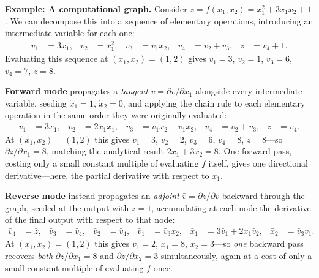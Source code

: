 \begin{exampleBox}
  \textbf{Example: A computational graph.} Consider $z=f(x_1,x_2)=x_1^2+3x_1x_2+1$. We can decompose this into a sequence of elementary operations, introducing an intermediate variable for each one:
  \begin{align*}
    v_1 &= 3x_1, & v_2 &= x_1^2, & v_3 &= v_1 x_2, & v_4 &= v_2+v_3, & z &= v_4+1.
  \end{align*}
  Evaluating this sequence at $(x_1,x_2)=(1,2)$ gives $v_1=3$, $v_2=1$, $v_3=6$, $v_4=7$, $z=8$.

  \textbf{Forward mode} propagates a \emph{tangent} $\dot v = \partial v/\partial x_1$ alongside every intermediate variable, seeding $\dot x_1=1$, $\dot x_2=0$, and applying the chain rule to each elementary operation in the same order they were originally evaluated:
  \begin{align*}
    \dot v_1 &= 3\dot x_1, & \dot v_2 &= 2x_1\dot x_1, & \dot v_3 &= \dot v_1 x_2+v_1\dot x_2, & \dot v_4 &= \dot v_2+\dot v_3, & \dot z &= \dot v_4.
  \end{align*}
  At $(x_1,x_2)=(1,2)$ this gives $\dot v_1=3$, $\dot v_2=2$, $\dot v_3=6$, $\dot v_4=8$, $\dot z=8$---so $\partial z/\partial x_1=8$, matching the analytical result $2x_1+3x_2=8$. One forward pass, costing only a small constant multiple of evaluating $f$ itself, gives one directional derivative---here, the partial derivative with respect to $x_1$.

  \textbf{Reverse mode} instead propagates an \emph{adjoint} $\bar v=\partial z/\partial v$ backward through the graph, seeded at the output with $\bar z=1$, accumulating at each node the derivative of the final output with respect to that node:
  \begin{align*}
    \bar v_4 &= \bar z, & \bar v_3&=\bar v_4, & \bar v_2&=\bar v_4, & \bar v_1&=\bar v_3 x_2, & \bar x_1&=3\bar v_1+2x_1\bar v_2, & \bar x_2&=\bar v_3 v_1.
  \end{align*}
  At $(x_1,x_2)=(1,2)$ this gives $\bar v_1=2$, $\bar x_1=8$, $\bar x_2=3$---so \emph{one} backward pass recovers \emph{both} $\partial z/\partial x_1=8$ and $\partial z/\partial x_2=3$ simultaneously, again at a cost of only a small constant multiple of evaluating $f$ once.
\end{exampleBox}

